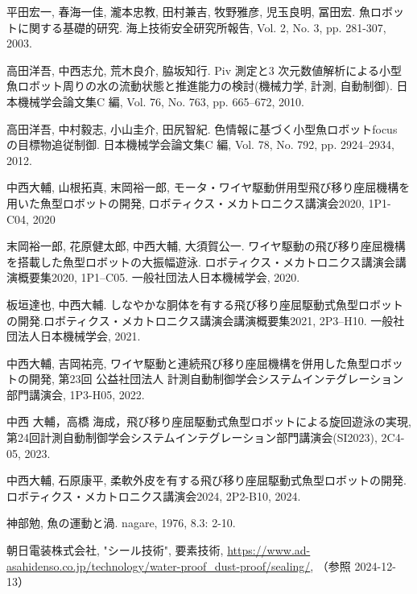 
\newpage
{}
\begin{thebibliography}{9}
    平田宏一, 春海一佳, 瀧本忠教, 田村兼吉, 牧野雅彦, 児玉良明, 冨田宏. 魚ロボットに関する基礎的研究. 海上技術安全研究所報告, Vol. 2, No. 3, pp. 281-307, 2003.
 
    高田洋吾, 中西志允, 荒木良介, 脇坂知行. Piv 測定と3 次元数値解析による小型魚ロボット周りの水の流動状態と推進能力の検討(機械力学, 計測, 自動制御). 日本機械学会論文集C 編, Vol. 76, No. 763, pp. 665–672, 2010.

    高田洋吾, 中村毅志, 小山圭介, 田尻智紀. 色情報に基づく小型魚ロボットfocus の目標物追従制御. 日本機械学会論文集C 編, Vol. 78, No. 792, pp. 2924–2934, 2012.

    中西大輔, 山根拓真, 末岡裕一郎, モータ・ワイヤ駆動併用型飛び移り座屈機構を用いた魚型ロボットの開発, ロボティクス・メカトロニクス講演会2020, 1P1-C04, 2020

    末岡裕一郎, 花原健太郎, 中西大輔, 大須賀公一. ワイヤ駆動の飛び移り座屈機構を搭載した魚型ロボットの大振幅遊泳. ロボティクス・メカトロニクス講演会講演概要集2020, 1P1–C05. 一般社団法人日本機械学会, 2020.

    板垣達也, 中西大輔. しなやかな胴体を有する飛び移り座屈駆動式魚型ロボットの開発.ロボティクス・メカトロニクス講演会講演概要集2021, 2P3–H10. 一般社団法人日本機械学会, 2021.

    中西大輔, 吉岡祐亮, ワイヤ駆動と連続飛び移り座屈機構を併用した魚型ロボットの開発, 第23回 公益社団法人 計測自動制御学会システムインテグレーション部門講演会, 1P3-H05, 2022.

    中西 大輔，高橋 海成，飛び移り座屈駆動式魚型ロボットによる旋回遊泳の実現, 第24回計測自動制御学会システムインテグレーション部門講演会(SI2023), 2C4-05, 2023.

    中西大輔, 石原康平, 柔軟外皮を有する飛び移り座屈駆動式魚型ロボットの開発. ロボティクス・メカトロニクス講演会2024, 2P2-B10, 2024.

    神部勉, 魚の運動と渦. nagare, 1976, 8.3: 2-10.

    朝日電装株式会社, "シール技術", 要素技術, \url{https://www.ad-asahidenso.co.jp/technology/water-proof_dust-proof/sealing/}, （参照 2024-12-13）

\end{thebibliography}


